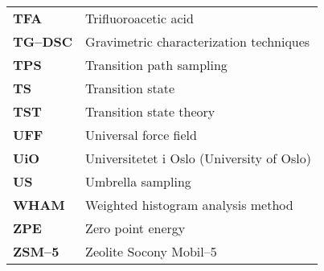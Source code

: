 \begin{longtable}{p{} p{}}
\textbf{TFA} & Trifluoroacetic acid\\
\textbf{TG--DSC} & Gravimetric characterization techniques\\ 
\textbf{TPS} & Transition path sampling  \\
\textbf{TS}  & Transition state \\
\textbf{TST} & Transition state theory  \\
\textbf{UFF} & Universal force field \\
\textbf{UiO} & Universitetet i Oslo (University of Oslo) \\ 
\textbf{US} & Umbrella sampling  \\
\textbf{WHAM} & Weighted histogram analysis method \\
\textbf{ZPE} & Zero point energy\\
\textbf{ZSM--5} & Zeolite Socony Mobil--5 \\ \hline
\end{longtable}
